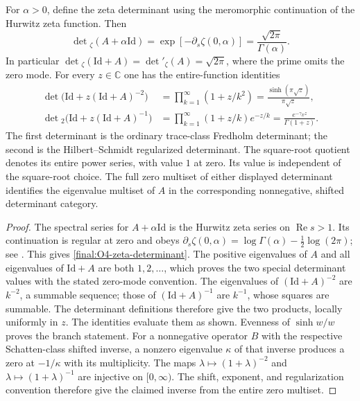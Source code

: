 \begin{proposition}
\label{final:O4-determinants}
For $\alpha>0$, define the zeta determinant using the meromorphic
continuation of the Hurwitz zeta function.  Then
\begin{equation}\label{final:O4-zeta-determinant}
 \det{}_{\zeta}(A+\alpha\mathrm{Id})
 =\exp[-\partial_s\zeta(0,\alpha)]
 =\frac{\sqrt{2\pi}}{\Gamma(\alpha)}.
\end{equation}
In particular
$\det{}_{\zeta}(\mathrm{Id}+A)=\det{}'_{\zeta}(A)=\sqrt{2\pi}$,
where the prime omits the zero mode.
For every $z\in\mathbb C$ one has the entire-function identities
\begin{align}
 \det\bigl(\mathrm{Id}+z(\mathrm{Id}+A)^{-2}\bigr)
 &=\prod_{k=1}^\infty(1+z/k^2)
   =\frac{\sinh(\pi\sqrt z)}{\pi\sqrt z},
   \label{final:O4-fredholm}\\
 \det{}_2\bigl(\mathrm{Id}+z(\mathrm{Id}+A)^{-1}\bigr)
 &=\prod_{k=1}^\infty(1+z/k)e^{-z/k}
   =\frac{e^{-\gamma_E z}}{\Gamma(1+z)}.
   \label{final:O4-det2}
\end{align}
The first determinant is the ordinary trace-class Fredholm determinant;
the second is the Hilbert--Schmidt regularized determinant.
The square-root quotient denotes its entire power series, with
value $1$ at zero.  Its value is independent of the square-root choice.
The full zero multiset of either displayed determinant identifies
the eigenvalue multiset of $A$ in the corresponding nonnegative,
shifted determinant category.
\end{proposition}

\begin{proof}
The spectral series for $A+\alpha\mathrm{Id}$ is the Hurwitz zeta
series on $\operatorname{Re}s>1$.  Its continuation is regular at
zero and obeys
$\partial_s\zeta(0,\alpha)=\log\Gamma(\alpha)-\tfrac12\log(2\pi)$;
see \cite[\href{https://dlmf.nist.gov/25.11.E18}{Eq.~25.11.18}]{DLMF}.
This gives \eqref{final:O4-zeta-determinant}.  The positive eigenvalues
of $A$ and all eigenvalues of $\mathrm{Id}+A$ are both $1,2,\ldots$,
which proves the two special determinant values with the stated
zero-mode convention.
The eigenvalues of $(\mathrm{Id}+A)^{-2}$ are $k^{-2}$, a summable
sequence; those of $(\mathrm{Id}+A)^{-1}$ are $k^{-1}$, whose squares
are summable.  The determinant definitions therefore give the two
products, locally uniformly in $z$.  The identities
\cite[\href{https://dlmf.nist.gov/4.36.E1}{Eqs.~4.36.1 and
5.8.2}]{DLMF} evaluate them as shown.
Evenness of $\sinh w/w$ proves the branch statement.
For a nonnegative operator $B$ with the respective Schatten-class
shifted inverse, a nonzero eigenvalue $\kappa$ of that inverse
produces a zero at $-1/\kappa$ with its multiplicity.
The maps $\lambda\mapsto(1+\lambda)^{-2}$ and
$\lambda\mapsto(1+\lambda)^{-1}$ are injective on $[0,\infty)$.
The shift, exponent, and regularization convention therefore give
the claimed inverse from the entire zero multiset.
\end{proof}

